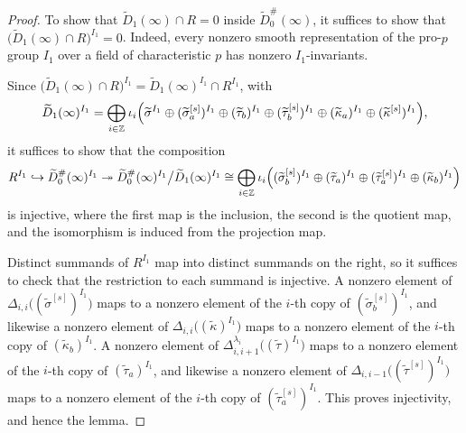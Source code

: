 \documentclass[a4paper,10pt,twoside]{amsart}
\theoremstyle{definition}
\numberwithin{equation}{section}
\begin{document}
\begin{proof}
To show that $\widetilde{D}_1(\infty) \cap R = 0$ inside
$\widetilde{D}_0^\#(\infty)$, it suffices to show that $\bigl(\widetilde{D}_1(\infty)
\cap R\bigr)^{I_1} = 0$. Indeed, every nonzero smooth representation of the
pro-\(p\) group \(I_1\) over a field of characteristic
\(p\) has nonzero \(I_1\)-invariants.

Since $\bigl(\widetilde{D}_1(\infty) \cap R\bigr)^{I_1} =
\widetilde{D}_1(\infty)^{I_1} \cap R^{I_1}$, with
\[
\widetilde{D}_1(\infty)^{I_1} = \bigoplus_{i \in \mathbb{Z}}\iota_i
\Bigl( \widetilde{\sigma}^{I_1} \oplus (\widetilde{\sigma}^{[s]}_a)^{I_1}
\oplus (\widetilde{\tau}_b)^{I_1} \oplus (\widetilde{\tau}^{[s]}_b)^{I_1}
\oplus (\widetilde{\kappa}_a)^{I_1} \oplus (\widetilde{\kappa}^{[s]})^{I_1} \Bigr),
\]
it suffices to show that the composition
\begin{equation*}
    R^{I_1}\hookrightarrow \widetilde{D}_0^\#(\infty)^{I_1}
\twoheadrightarrow \widetilde{D}_0^\#(\infty)^{I_1}\big/\widetilde{D}_1(\infty)^{I_1} 
\cong \bigoplus_{i \in \mathbb{Z}} \iota_i\Bigl( (\widetilde{\sigma}^{[s]}_b)^{I_1}
\oplus (\widetilde{\tau}_a)^{I_1} \oplus (\widetilde{\tau}^{[s]}_a)^{I_1}
\oplus (\widetilde{\kappa}_b)^{I_1} \Bigr)
\end{equation*}
is injective, where the first map is the inclusion, the second is the
quotient map, and the isomorphism is induced from the projection map. 

Distinct summands of \(R^{I_1}\) map into distinct
summands on the right, so it suffices to check that
the restriction to each summand is injective. A nonzero element of
$\Delta_{i,i}\bigl((\widetilde{\sigma}^{[s]})^{I_1}\bigr)$ maps to a
nonzero element of the $i$-th copy of $(\widetilde{\sigma}^{[s]}_b)^{I_1}$,
and likewise a nonzero element of $\Delta_{i,i}\bigl((\widetilde{\kappa})^{I_1}\bigr)$
maps to a nonzero element of the $i$-th copy of $(\widetilde{\kappa}_b)^{I_1}$.
A nonzero element of $\Delta_{i,i+1}^{\lambda_i}\bigl((\widetilde{\tau})^{I_1}\bigr)$
maps to a nonzero element of the $i$-th copy of $(\widetilde{\tau}_a)^{I_1}$,
and likewise a nonzero element of
$\Delta_{i,i-1}\bigl((\widetilde{\tau}^{[s]})^{I_1}\bigr)$ maps to a nonzero
element of the $i$-th copy of $(\widetilde{\tau}^{[s]}_a)^{I_1}$. This
proves injectivity, and hence the lemma.
\end{proof}
\end{document}
